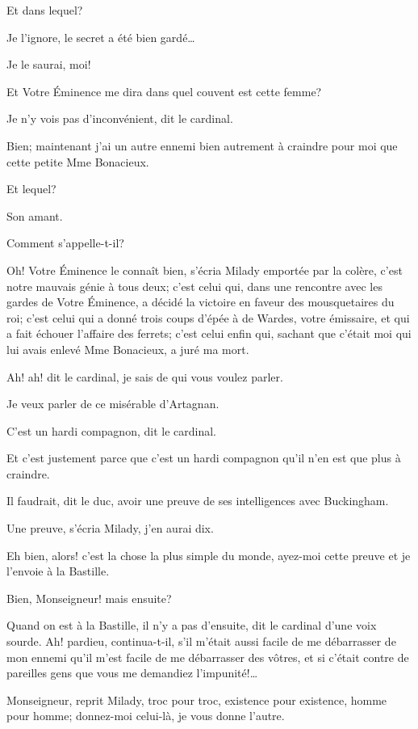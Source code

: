 \speak  Et dans lequel? 

\speak  Je l'ignore, le secret a été bien gardé\dots 

\speak  Je le saurai, moi! 

\speak  Et Votre Éminence me dira dans quel couvent est cette femme? 

\speak  Je n'y vois pas d'inconvénient, dit le cardinal. 

\speak  Bien; maintenant j'ai un autre ennemi bien autrement à craindre pour moi que cette petite Mme Bonacieux. 

\speak  Et lequel? 

\speak  Son amant. 

\speak  Comment s'appelle-t-il? 

\speak  Oh! Votre Éminence le connaît bien, s'écria Milady emportée par la colère, c'est notre mauvais génie à tous deux; c'est celui qui, dans une rencontre avec les gardes de Votre Éminence, a décidé la victoire en faveur des mousquetaires du roi; c'est celui qui a donné trois coups d'épée à de Wardes, votre émissaire, et qui a fait échouer l'affaire des ferrets; c'est celui enfin qui, sachant que c'était moi qui lui avais enlevé Mme Bonacieux, a juré ma mort. 

\speak  Ah! ah! dit le cardinal, je sais de qui vous voulez parler. 

\speak  Je veux parler de ce misérable d'Artagnan. 

\speak  C'est un hardi compagnon, dit le cardinal. 

\speak  Et c'est justement parce que c'est un hardi compagnon qu'il n'en est que plus à craindre. 

\speak  Il faudrait, dit le duc, avoir une preuve de ses intelligences avec Buckingham. 

\speak  Une preuve, s'écria Milady, j'en aurai dix. 

\speak  Eh bien, alors! c'est la chose la plus simple du monde, ayez-moi cette preuve et je l'envoie à la Bastille. 

\speak  Bien, Monseigneur! mais ensuite? 

\speak  Quand on est à la Bastille, il n'y a pas d'ensuite, dit le cardinal d'une voix sourde. Ah! pardieu, continua-t-il, s'il m'était aussi facile de me débarrasser de mon ennemi qu'il m'est facile de me débarrasser des vôtres, et si c'était contre de pareilles gens que vous me demandiez l'impunité!\dots 

\speak  Monseigneur, reprit Milady, troc pour troc, existence pour existence, homme pour homme; donnez-moi celui-là, je vous donne l'autre. 

